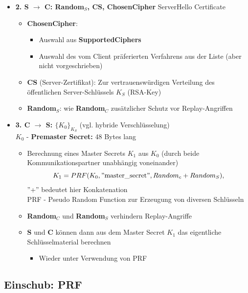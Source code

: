 \documentclass[openany]{book}
\begin{document}
\begin{itemize}
    \item \textbf{2. S $\rightarrow$ C: Random$_S$, CS, Chosen\textunderscore Cipher} ServerHello Certificate
    \begin{itemize}
        \item \textbf{Chosen\textunderscore Cipher}:
        \begin{itemize}
            \item Auswahl aus \textbf{Supported\textunderscore Ciphers}
            \item Auswahl des vom Client präferierten Verfahrens aus der Liste (aber nicht vorgeschrieben)
        \end{itemize}
        \item \textbf{CS} (Server-Zertifikat): Zur vertrauenswürdigen Verteilung des öffentlichen Server-Schlüssels $K_S$ (RSA-Key)
        \item \textbf{Random$_S$}: wie \textbf{Random$_C$} zusätzlicher Schutz vor Replay-Angriffen
    \end{itemize}
    \item \textbf{3. C $\rightarrow$ S: $\{ K_0\}_{K_S}$} (vgl. hybride Verschlüsselung) \\ $K_0$ - \textbf{Premaster Secret:} 48 Bytes lang
    \begin{itemize}
        \item Berechnung eines Master Secrets $K_1$ aus $K_0$ (durch beide Kommunikationspartner unabhängig voneinander) $$K_1 = PRF(K_0,\text{''master\textunderscore secret''},Random_c+Random_S),$$ ''+'' bedeutet hier Konkatenation \\ PRF - Pseudo Random Function zur Erzeugung von diversen Schlüsseln
        \item \textbf{Random$_C$} und \textbf{Random$_S$} verhindern Replay-Angriffe 
        \item \textbf{S} und \textbf{C} können dann aus dem Master Secret $K_1$ das eigentliche Schlüsselmaterial berechnen
        \begin{itemize}
            \item Wieder unter Verwendung von PRF
        \end{itemize}
    \end{itemize}
\end{itemize}

\subsection{Einschub: PRF}
\end{document}
